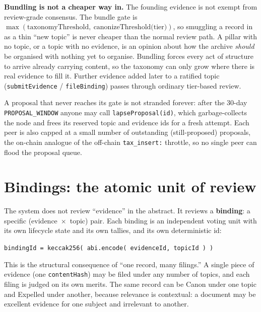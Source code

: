 \documentclass[11pt,a4paper]{article}
\begin{document}
\begin{notebox}
\textbf{Bundling is not a cheaper way in.} The founding evidence is not
exempt from review-grade consensus. The bundle gate is
$\max(\text{taxonomyThreshold},\ \text{canonizeThreshold(tier)})$, so
smuggling a record in as a thin ``new topic'' is never cheaper than the
normal review path. A pillar with no topic, or a topic with no evidence, is
an opinion about how the archive \emph{should} be organised with nothing yet
to organise. Bundling forces every act of structure to arrive already
carrying content, so the taxonomy can only grow where there is real evidence
to fill it. Further evidence added later to a ratified topic
(\texttt{submitEvidence} / \texttt{fileBinding}) passes through ordinary
tier-based review.
\end{notebox}

A proposal that never reaches its gate is not stranded forever: after the
30-day \texttt{PROPOSAL\_WINDOW} anyone may call \texttt{lapseProposal(id)},
which garbage-collects the node and frees its reserved topic and evidence
ids for a fresh attempt. Each peer is also capped at a small number of
outstanding (still-proposed) proposals, the on-chain analogue of the
off-chain \texttt{tax\_insert:} throttle, so no single peer can flood the
proposal queue.

\section{Bindings: the atomic unit of review}

The system does not review ``evidence'' in the abstract. It reviews a
\textbf{binding}: a specific (evidence~$\times$~topic) pair. Each binding is
an independent voting unit with its own lifecycle state and its own tallies,
and its own deterministic id:

\begin{plainbox}
\texttt{bindingId = keccak256( abi.encode( evidenceId, topicId ) )}
\end{plainbox}

This is the structural consequence of ``one record, many filings.'' A single
piece of evidence (one \texttt{contentHash}) may be filed under any number of
topics, and each filing is judged on its own merits. The same record can be
Canon under one topic and Expelled under another, because relevance is
contextual: a document may be excellent evidence for one subject and
irrelevant to another.
\end{document}
